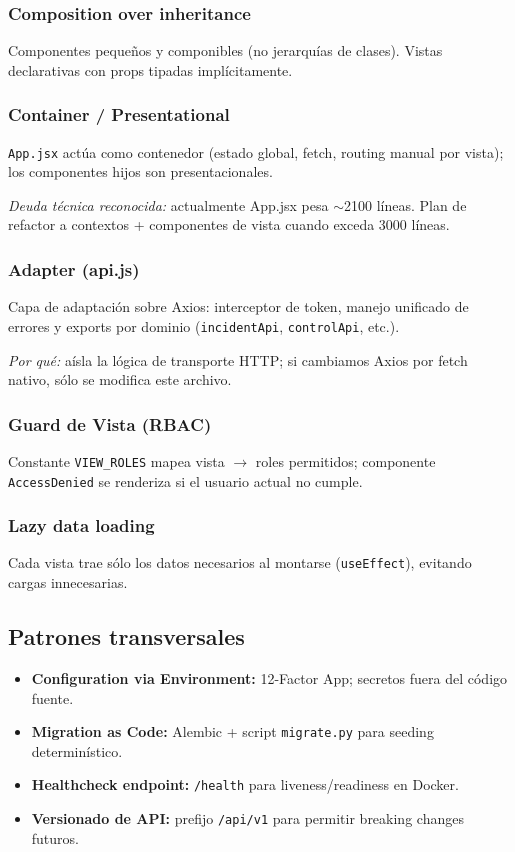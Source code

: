 \documentclass[12pt,a4paper,oneside]{article}
\begin{document}
\subsubsection{Composition over inheritance}
Componentes pequeños y componibles (no jerarquías de clases). Vistas declarativas con props tipadas implícitamente.

\subsubsection{Container / Presentational}
\texttt{App.jsx} actúa como contenedor (estado global, fetch, routing manual por vista); los componentes hijos son presentacionales.

\textit{Deuda técnica reconocida:} actualmente App.jsx pesa $\sim$2100 líneas. Plan de refactor a contextos + componentes de vista cuando exceda 3000 líneas.

\subsubsection{Adapter (api.js)}
Capa de adaptación sobre Axios: interceptor de token, manejo unificado de errores y exports por dominio (\texttt{incidentApi}, \texttt{controlApi}, etc.).

\textit{Por qué:} aísla la lógica de transporte HTTP; si cambiamos Axios por fetch nativo, sólo se modifica este archivo.

\subsubsection{Guard de Vista (RBAC)}
Constante \texttt{VIEW\_ROLES} mapea vista $\rightarrow$ roles permitidos; componente \texttt{AccessDenied} se renderiza si el usuario actual no cumple.

\subsubsection{Lazy data loading}
Cada vista trae sólo los datos necesarios al montarse (\texttt{useEffect}), evitando cargas innecesarias.

\subsection{Patrones transversales}

\begin{itemize}[leftmargin=*]
  \item \textbf{Configuration via Environment:} 12-Factor App; secretos fuera del código fuente.
  \item \textbf{Migration as Code:} Alembic + script \texttt{migrate.py} para seeding determinístico.
  \item \textbf{Healthcheck endpoint:} \texttt{/health} para liveness/readiness en Docker.
  \item \textbf{Versionado de API:} prefijo \texttt{/api/v1} para permitir breaking changes futuros.
\end{itemize}
\end{document}
